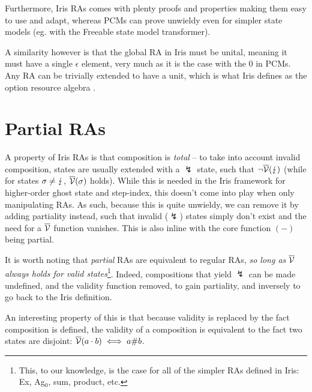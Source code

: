Furthermore, Iris RAs comes with plenty proofs and properties making them easy to use and adapt, whereas PCMs can prove unwieldy even for simpler state models (eg. with the Freeable state model transformer).

A similarity however is that the global RA in Iris must be unital, meaning it must have a single $\epsilon$ element, very much as it is the case with the 0 in PCMs. Any RA can be trivially extended to have a unit, which is what Iris defines as the option resource algebra \cite{iris-option}.

\section{Partial RAs}

A property of Iris RAs is that composition is \emph{total} -- to take into account invalid composition, states are usually extended with a $\lightning$ state, such that $\neg \overline{\cal V}(\lightning)$ (while for states $\sigma\neq\lightning$, $\overline{\cal V}(\sigma)$ holds). While this is needed in the Iris framework for higher-order ghost state and step-index, this doesn't come into play when only manipulating RAs. As such, because this is quite unwieldy, we can remove it by adding partiality instead, such that invalid ($\lightning$) states simply don't exist and the need for a $\overline{\cal V}$ function vanishes. This is also inline with the core function $(-)$ being partial.

It is worth noting that \emph{partial} RAs are equivalent to regular RAs, \emph{so long as $\overline{\cal V}$ always holds for valid states}\footnote{This, to our knowledge, is the case for all of the simpler RAs defined in Iris: Ex, Ag${}_0$, sum, product, etc.}. Indeed, compositions that yield $\lightning$ can be made undefined, and the validity function removed, to gain partiality, and inversely to go back to the Iris definition.

An interesting property of this is that because validity is replaced by the fact composition is defined, the validity of a composition is equivalent to the fact two states are disjoint: $\overline{\cal V}(a\cdot b) \iff a \# b$.

